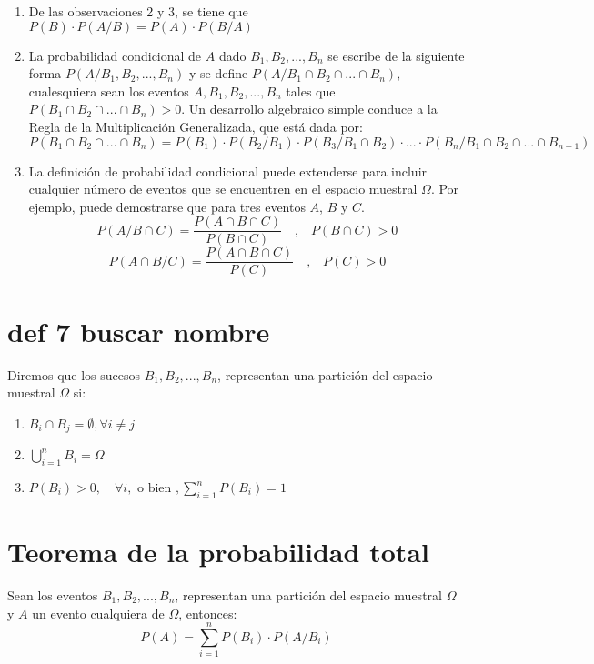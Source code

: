 \documentclass{templateNote}
\begin{document}
\begin{enumerate}
    \item De las observaciones 2 y 3, se tiene que $ P(B) \cdot P(A/B) = P(A) \cdot P(B/A)$
    
    \item  La probabilidad condicional de $A$ dado $B_1,B_2, ... , B_n$ se escribe de la siguiente forma $P(A/B_1, B_2, ... , B_n)$ y se define $P(A / B_1 \cap B_2 \cap ... \cap B_n)$, cualesquiera sean los eventos $ A, B_1,B_2, ... , B_n$ tales que $P(B_1 \cap B_2 \cap ... \cap B_n ) > 0$. Un desarrollo algebraico simple
    conduce a la Regla de la Multiplicación Generalizada, que está dada por:
    $P(B_1 \cap B_2 \cap ... \cap B_n) = P(B_1) \cdot P(B_2/B_1) \cdot P(B_3 / B_1 \cap B_2) \cdot ... \cdot P(B_n / B_1 \cap B_2 \cap ... \cap B_{n-1})$
    
    \item La definición de probabilidad condicional puede extenderse para incluir
    cualquier número de eventos que se encuentren en el espacio muestral $\Omega$. Por
    ejemplo, puede demostrarse que para tres eventos $A$, $B$ y $C$.
    \begin{equation*}
        P(A / B \cap C) = \frac{P(A \cap B \cap C)}{P(B \cap C)} \quad \text{,} \quad P(B \cap C) > 0
    \end{equation*}
    \begin{equation*}
        P(A \cap B / C) = \frac{P(A \cap B \cap C)}{P(C)} \quad \text{,} \quad P(C) > 0
    \end{equation*}
    
\end{enumerate}

\newpage
\section{def 7 buscar nombre}
\indent
Diremos que los sucesos $B_1, B_2, ... , B_n$, representan una partición del
espacio muestral $\Omega$ si:
\begin{enumerate}
    \item $B_i \cap B_j = \emptyset, \forall i \neq j$
    \item $\displaystyle \bigcup_{i=1}^{n} B_i = \Omega$
    \item $P(B_i) > 0, \quad \forall i, \text{ o bien }, \displaystyle \sum_{i=1}^{n} P(B_i) = 1 $
\end{enumerate}

\section{Teorema de la probabilidad total}
\indent
Sean los eventos $B_1,B_2, ... , B_n$, representan una partición del espacio muestral $\Omega$ y $A$
un evento cualquiera de $\Omega$, entonces:
\begin{equation*}
    P(A) = \displaystyle \sum_{i=1}^{n} P(B_i) \cdot P(A / B_i)
\end{equation*}
\end{document}
